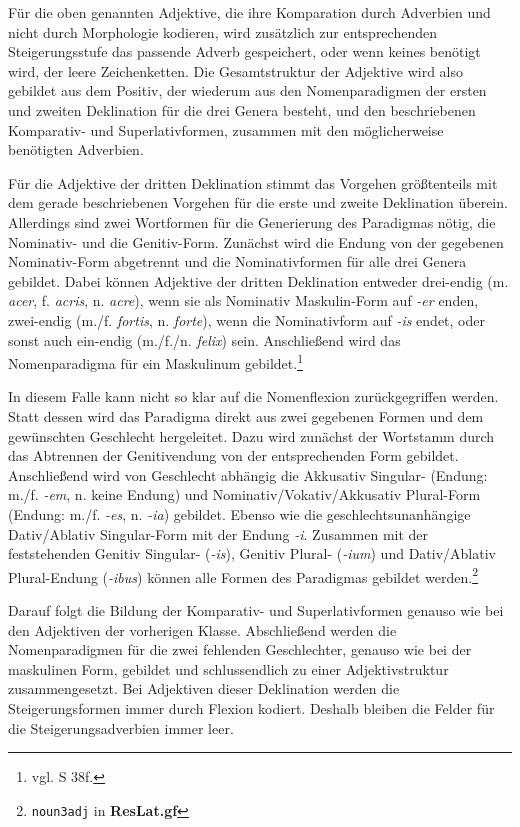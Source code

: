 \documentclass[fontsize=12pt,abstract=on,titlepage,bibliography=totoc,ngerman,listof=totoc]{scrreprt}
\begin{document}
Für die oben genannten Adjektive, die ihre Komparation durch Adverbien und nicht durch Morphologie kodieren, wird zusätzlich zur entsprechenden Steigerungsstufe das passende Adverb gespeichert, oder wenn keines benötigt wird, der leere Zeichenketten. Die Gesamtstruktur der Adjektive wird also gebildet aus dem Positiv, der wiederum aus den Nomenparadigmen der ersten und zweiten Deklination für die drei Genera besteht, und den beschriebenen Komparativ- und Superlativformen, zusammen mit den möglicherweise benötigten Adverbien.\par
Für die Adjektive der dritten Deklination stimmt das Vorgehen größtenteils mit dem gerade beschriebenen Vorgehen für die erste und zweite Deklination überein. Allerdings sind zwei Wortformen für die Generierung des Paradigmas nötig, die Nominativ- und die Genitiv-Form. Zunächst wird die Endung von der gegebenen Nominativ-Form abgetrennt und die Nominativformen für alle drei Genera gebildet. Dabei können Adjektive der dritten Deklination entweder drei-endig (m. \textit{acer}, f. \textit{acris}, n. \textit{acre}), wenn sie als Nominativ Maskulin-Form auf \textit{-er} enden, zwei-endig (m./f. \textit{fortis}, n. \textit{forte}), wenn die Nominativform auf \textit{-is} endet, oder sonst auch ein-endig (m./f./n. \textit{felix}) sein. Anschließend wird das Nomenparadigma für ein Maskulinum gebildet.\footnote{vgl. \cite{BAYER-LINDAUER1994} S 38f.} \par
In diesem Falle kann nicht so klar auf die Nomenflexion zurückgegriffen werden. Statt dessen wird das Paradigma direkt aus zwei gegebenen Formen und dem gewünschten Geschlecht hergeleitet. Dazu wird zunächst der Wortstamm durch das Abtrennen der Genitivendung von der entsprechenden Form gebildet. Anschließend wird von Geschlecht abhängig die Akkusativ Singular- (Endung: m./f. \textit{-em}, n. keine Endung) und Nominativ/Vokativ/Akkusativ Plural-Form (Endung: m./f. \textit{-es}, n. \textit{-ia}) gebildet. Ebenso wie die geschlechtsunanhängige Dativ/Ablativ Singular-Form mit der Endung \textit{-i}. Zusammen mit der feststehenden Genitiv Singular- (\textit{-is}), Genitiv Plural- (\textit{-ium}) und Dativ/Ablativ Plural-Endung (\textit{-ibus}) können alle Formen des Paradigmas gebildet werden.\footnote{\texttt{noun3adj} in \textbf{ResLat.gf}} \par
Darauf folgt die Bildung der Komparativ- und Superlativformen genauso wie bei den Adjektiven der vorherigen Klasse. Abschließend werden die Nomenparadigmen für die zwei fehlenden Geschlechter, genauso wie bei der maskulinen Form, gebildet und schlussendlich zu einer Adjektivstruktur zusammengesetzt. Bei Adjektiven dieser Deklination werden die Steigerungsformen immer durch Flexion kodiert. Deshalb bleiben die Felder für die Steigerungsadverbien immer leer.
\end{document}
